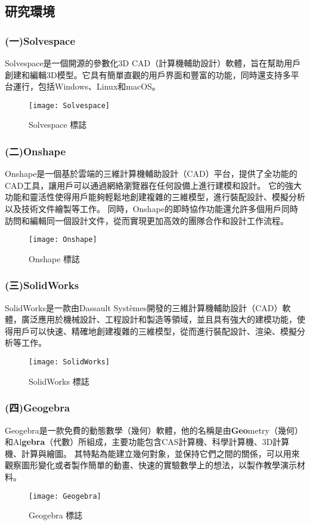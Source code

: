 \subsection{研究環境}

\subsubsection{(一)Solvespace}
\fontsize{14pt}{2.5pt}\sectionef\hspace{12pt}
Solvespace是一個開源的參數化3D CAD（計算機輔助設計）軟體，旨在幫助用戶創建和編輯3D模型。它具有簡單直觀的用戶界面和豐富的功能，同時還支持多平台運行，包括Windows、Linux和macOS。\\
\begin{figure}[hbt!]
\center
\texttt{[image: Solvespace]}
\caption{\Large Solvespace 標誌}
\end{figure}

\subsubsection{(二)Onshape}

Onshape是一個基於雲端的三維計算機輔助設計（CAD）平台，提供了全功能的CAD工具，讓用戶可以通過網絡瀏覽器在任何設備上進行建模和設計。
它的強大功能和靈活性使得用戶能夠輕鬆地創建複雜的三維模型，進行裝配設計、模擬分析以及技術文件繪製等工作。
同時，Onshape的即時協作功能還允許多個用戶同時訪問和編輯同一個設計文件，從而實現更加高效的團隊合作和設計工作流程。\\
\begin{figure}[hbt!]
\center
\texttt{[image: Onshape]}
\caption{\Large Onshape 標誌}
\end{figure}


\subsubsection{(三)SolidWorks}
SolidWorks是一款由Dassault Systèmes開發的三維計算機輔助設計（CAD）軟體，廣泛應用於機械設計、工程設計和製造等領域，並且具有強大的建模功能，使得用戶可以快速、精確地創建複雜的三維模型，從而進行裝配設計、渲染、模擬分析等工作。\\
\begin{figure}[hbt!]
\center
\texttt{[image: SolidWorks]}
\caption{\Large SolidWorks 標誌}
\end{figure}


\subsubsection{(四)Geogebra}
Geogebra是一款免費的動態數學（幾何）軟體，他的名稱是由\textbf{Geo}metry（幾何）和Al\textbf{gebra}（代數）所組成，主要功能包含CAS計算機、科學計算機、3D計算機、計算與繪圖。
其特點為能建立幾何對象，並保持它們之間的關係，可以用來觀察圖形變化或者製作簡單的動畫、快速的實驗數學上的想法，以製作教學演示材料。\\
\begin{figure}[hbt!]
\center
\texttt{[image: Geogebra]}
\caption{\Large Geogebra 標誌}
\end{figure}

